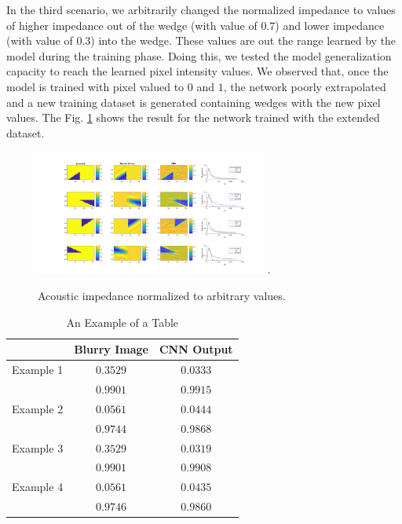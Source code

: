 \documentclass[conference,compsoc]{IEEEtran}
\begin{document}
In the third scenario, we arbitrarily changed the normalized impedance to values
of higher impedance out of the wedge (with value of $0.7$) and lower impedance (with value of $0.3$)
into the wedge. These values are out the range learned by the model during the training phase.
Doing this, we tested the model generalization capacity to reach the learned pixel intensity values.
We observed that, once the model is trained with pixel valued to $0$ and $1$, the network poorly
extrapolated and a new training dataset is generated containing wedges with the new pixel values.
The Fig. \ref{fig_scenario2} shows the result for the network trained with the extended dataset.
\begin{figure}[!t]
\centering
\includegraphics[width=3.0in]{Figs/Caso2}
\DeclareGraphicsExtensions.
\caption{Acoustic impedance normalized to arbitrary values.}
\label{fig_scenario2}
\end{figure}

\begin{table}[!t]
\renewcommand{\arraystretch}{1.3}
\caption{An Example of a Table}
\label{table_caso_3}
\centering
\begin{tabular}{|c||c||c|}
\hline
 & Blurry Image & CNN Output \\
\hline
Example 1 & $0.3529$ & $0.0333$\\
\hline
	  & $0.9901$ & $0.9915$\\
\hline
Example 2 & $0.0561$ & $0.0444$ \\
\hline
	  & $0.9744$ & $0.9868$\\
\hline
Example 3 & $0.3529$ & $0.0319$\\
\hline
	  & $0.9901$ & $0.9908$\\
\hline
Example 4 & $0.0561$ & $0.0435$\\
\hline
	  & $0.9746$ & $0.9860$\\
\hline
\end{tabular}
\end{table}
\end{document}
